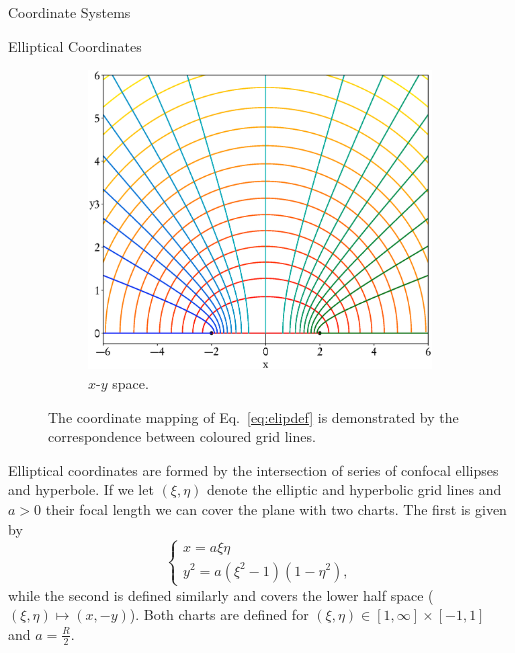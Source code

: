 \documentclass[letterpaper, 11 pt]{report}
\begin{document}
\begin{appendices}
\begin{chapter}{Coordinate Systems \label{chap:coords}}
\begin{section}{Elliptical Coordinates \label{sec:elliptic}}
\begin{figure}[t]
\begin{subfigure}{.5\textwidth}
               \includegraphics[width=\linewidth]{./images/appendix/eliptical.eps}
               \caption{$x$-$y$ space. \label{fig:xy}}
            \end{subfigure}
            \caption[Coordinate chart of elliptical coordinates]{The coordinate mapping of
                     Eq.~\eqref{eq:elipdef} is demonstrated by the correspondence between
                     coloured grid lines.\label{fig:elliptic}}
         \end{figure}

         Elliptical coordinates are formed by the intersection of series of confocal ellipses and
         hyperbole. If we let $(\xi, \eta)$ denote the elliptic and hyperbolic grid lines and $a > 0$
         their focal length we can cover the plane with two charts. The first is given by
         \begin{equation} \label{eq:elipdef}
            \left\{
            \begin{array}{l}
               x   = a \xi \eta \\
               y^2 = a \left( \xi^2 - 1 \right) \left( 1 - \eta^2 \right),
            \end{array}
            \right.
         \end{equation}
         while the second is defined similarly and covers the lower half space ($(\xi,\eta) \mapsto
         (x,-y)$). Both charts are defined for $(\xi,\eta) \in [1, \infty] \times [-1,1]$ and
         $a = \frac{R}{2}$.


\end{section}
\end{chapter}
\end{appendices}
\end{document}

